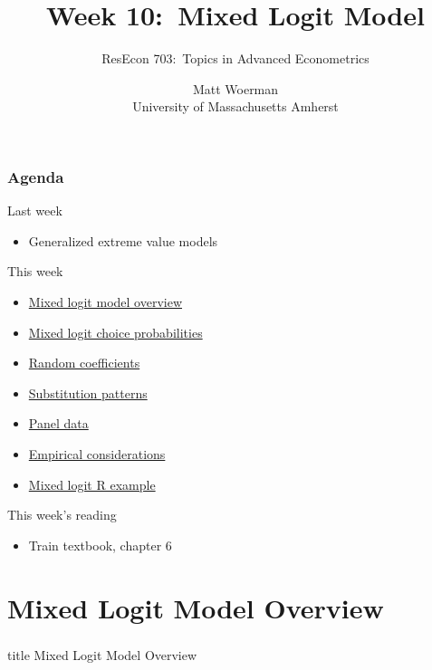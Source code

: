 \documentclass{beamer}
\title[Week 10:\ Mixed Logit Model]{Week 10:\ Mixed Logit Model}
\author[ResEcon 703:\ Advanced Econometrics]{ResEcon 703:\ Topics in Advanced Econometrics}
\date{Matt Woerman\\University of Massachusetts Amherst}
\begin{document}
{ 
\begin{frame}[noframenumbering]
    \titlepage
\end{frame}
}

\begin{frame}\frametitle{Agenda}
    Last week
    \begin{itemize}
        \item Generalized extreme value models
    \end{itemize}
    \vspace{2ex}
    This week
    \begin{itemize}
    	\item \hyperlink{page.\getpagerefnumber{overview}}{Mixed logit model overview}
    	\item \hyperlink{page.\getpagerefnumber{prob}}{Mixed logit choice probabilities}
        \item \hyperlink{page.\getpagerefnumber{random}}{Random coefficients}
        \item \hyperlink{page.\getpagerefnumber{subs}}{Substitution patterns}
        \item \hyperlink{page.\getpagerefnumber{panel}}{Panel data}
        \item \hyperlink{page.\getpagerefnumber{empirical}}{Empirical considerations}
        \item \hyperlink{page.\getpagerefnumber{example}}{Mixed logit R example}
    \end{itemize}
    \vspace{2ex}
    This week's reading
    \begin{itemize}
    	\item Train textbook, chapter 6
    \end{itemize}
\end{frame}

\section{Mixed Logit Model Overview}
\label{overview}
\begin{frame}\frametitle{}
    \vfill
    \centering
    \begin{beamercolorbox}[center]{title}
        \Large Mixed Logit Model Overview
    \end{beamercolorbox}
    \vfill
\end{frame}
\end{document}
